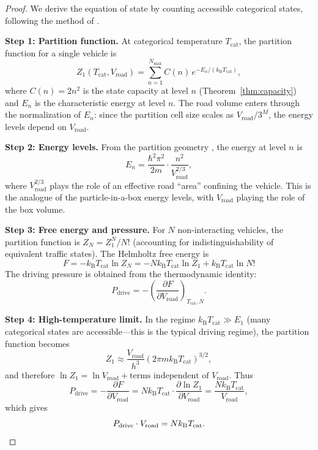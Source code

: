 \documentclass[twocolumn,10pt]{article}
\newcommand{\kB}{k_{\mathrm{B}}}
\newcommand{\Tcat}{T_{\mathrm{cat}}}
\newcommand{\Pdrive}{P_{\mathrm{drive}}}
\newcommand{\Vroad}{V_{\mathrm{road}}}
\begin{document}
\begin{proof}
We derive the equation of state by counting accessible categorical states, following the method of \cite{sachikonye2026gas, sachikonye2026single}.

\textbf{Step 1: Partition function.} At categorical temperature $\Tcat$, the partition function for a single vehicle is
\begin{equation}
Z_1(\Tcat, \Vroad) = \sum_{n=1}^{N_{\mathrm{max}}} C(n)\, e^{-E_n / (\kB \Tcat)},
\end{equation}
where $C(n) = 2n^2$ is the state capacity at level $n$ (Theorem~\ref{thm:capacity}) and $E_n$ is the characteristic energy at level $n$. The road volume enters through the normalization of $E_n$: since the partition cell size scales as $\Vroad / 3^M$, the energy levels depend on $\Vroad$.

\textbf{Step 2: Energy levels.} From the partition geometry \cite{sachikonye2026depth}, the energy at level $n$ is
\begin{equation}
E_n = \frac{\hbar^2 \pi^2}{2m} \cdot \frac{n^2}{\Vroad^{2/3}},
\end{equation}
where $\Vroad^{2/3}$ plays the role of an effective road ``area'' confining the vehicle. This is the analogue of the particle-in-a-box energy levels, with $\Vroad$ playing the role of the box volume.

\textbf{Step 3: Free energy and pressure.} For $N$ non-interacting vehicles, the partition function is $Z_N = Z_1^N / N!$ (accounting for indistinguishability of equivalent traffic states). The Helmholtz free energy is
\begin{equation}
F = -\kB \Tcat \ln Z_N = -N \kB \Tcat \ln Z_1 + \kB \Tcat \ln N!
\end{equation}
The driving pressure is obtained from the thermodynamic identity:
\begin{equation}
\Pdrive = -\left(\frac{\partial F}{\partial \Vroad}\right)_{\Tcat, N}.
\end{equation}

\textbf{Step 4: High-temperature limit.} In the regime $\kB \Tcat \gg E_1$ (many categorical states are accessible---this is the typical driving regime), the partition function becomes
\begin{equation}
Z_1 \approx \frac{\Vroad}{h^3}(2\pi m \kB \Tcat)^{3/2},
\end{equation}
and therefore $\ln Z_1 = \ln \Vroad + \text{terms independent of } \Vroad$. Thus
\begin{equation}
\Pdrive = -\frac{\partial F}{\partial \Vroad} = N \kB \Tcat \cdot \frac{\partial \ln Z_1}{\partial \Vroad} = \frac{N \kB \Tcat}{\Vroad},
\end{equation}
which gives
\begin{equation}
\Pdrive \cdot \Vroad = N \kB \Tcat. \qedhere
\end{equation}
\end{proof}
\end{document}
